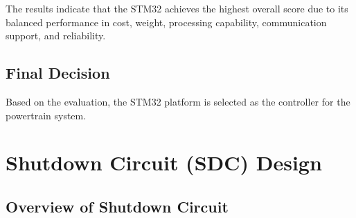 \documentclass[11pt, a4paper]{report}
\numberwithin{equation}{section}
\begin{document}
\begin{table}[H]
\centering
\small
\renewcommand{\arraystretch}{1.5}
\setlength{\tabcolsep}{3pt}

\caption{Merit Matrix for Controller Selection}

\end{table}

The results indicate that the STM32 achieves the highest overall score due to its balanced performance in cost, weight, processing capability, communication support, and reliability.

\subsection{Final Decision}

Based on the evaluation, the STM32 platform is selected as the controller for the powertrain system.

\section{Shutdown Circuit (SDC) Design}

\subsection{Overview of Shutdown Circuit}
\end{document}

